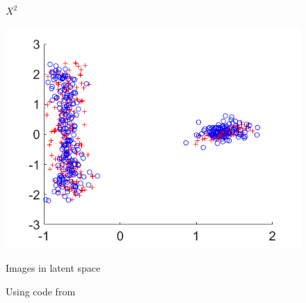 \documentclass{beamer}
\begin{document}
\begin{frame}
\begin{figure}
\begin{minipage}[b]{0.32\linewidth}
      \caption{$X^2$}
    \end{minipage}
    \hfill
    \begin{minipage}[b]{0.32\linewidth}
      \includegraphics[width=\textwidth]{./Images/Synthetic2/result.png}
      \caption{Images in latent space}
    \end{minipage}
    \caption{Using code from \cite{Tuia2016}}
  \end{figure}

\end{frame}

\end{document}

